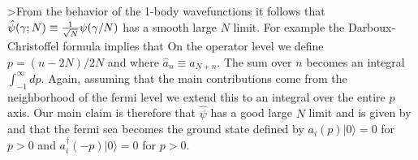 >From the behavior of the 1-body wavefunctions it follows that
$\hat \psi(\gamma;N)\equiv {1\over \sqrt{N}}\psi(\gamma/N)$
has a smooth large $N$ limit.
For example the Darboux-Christoffel formula
\eqn{} 
implies that
\eqn{}
On the operator level we define $p=(n-2N)/2N$ and 
\eqn{}
where $\hat a_n\equiv a_{N+n}$. The sum over $n$ becomes an
integral $\int^{\infty}_{-1}dp$. 
Again, assuming that the main contributions
come from the neighborhood of the fermi level we extend this to 
an integral over the entire $p$ axis.
Our main claim is therefore that $\hat \psi$ has a good large $N$
limit and is given by 
\eqn{}
and that the fermi sea becomes the ground state 
defined by 
$a_i(p)|0\rangle=0$ for $p>0$ and $a_i^\dagger(-p)|0\rangle=0$
for $p>0$. 

